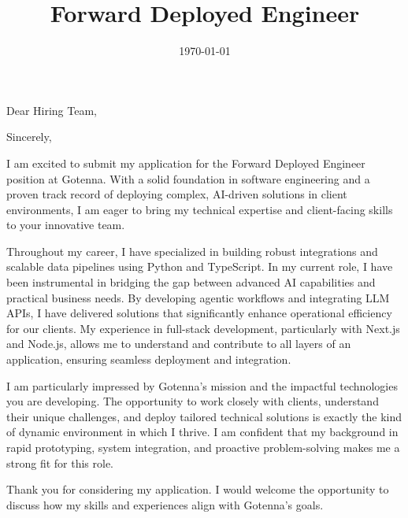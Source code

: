 \documentclass[11pt,a4paper,sans]{moderncv}
\title{Forward Deployed Engineer}
\begin{document}
\date{\today}
\opening{Dear Hiring Team,}
\closing{Sincerely,}

\makelettertitle

I am excited to submit my application for the Forward Deployed Engineer position at Gotenna. With a solid foundation in software engineering and a proven track record of deploying complex, AI-driven solutions in client environments, I am eager to bring my technical expertise and client-facing skills to your innovative team.

Throughout my career, I have specialized in building robust integrations and scalable data pipelines using Python and TypeScript. In my current role, I have been instrumental in bridging the gap between advanced AI capabilities and practical business needs. By developing agentic workflows and integrating LLM APIs, I have delivered solutions that significantly enhance operational efficiency for our clients. My experience in full-stack development, particularly with Next.js and Node.js, allows me to understand and contribute to all layers of an application, ensuring seamless deployment and integration.

I am particularly impressed by Gotenna's mission and the impactful technologies you are developing. The opportunity to work closely with clients, understand their unique challenges, and deploy tailored technical solutions is exactly the kind of dynamic environment in which I thrive. I am confident that my background in rapid prototyping, system integration, and proactive problem-solving makes me a strong fit for this role.

Thank you for considering my application. I would welcome the opportunity to discuss how my skills and experiences align with Gotenna's goals.

\makeletterclosing
\end{document}
